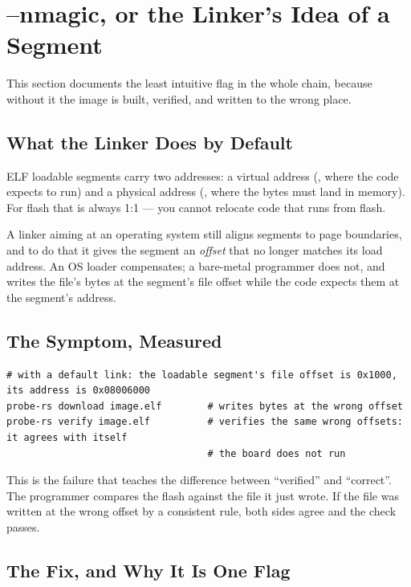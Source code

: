 \section{--nmagic, or the Linker's Idea of a Segment}
\label{sec:build-nmagic}

This section documents the least intuitive flag in the whole chain, because without it the image is
built, verified, and written to the wrong place.

\subsection{What the Linker Does by Default}

ELF loadable segments carry two addresses: a virtual address (, where the code expects
to run) and a physical address (, where the bytes must land in memory). For flash that
is always 1:1 — you cannot relocate code that runs from flash.

A linker aiming at an operating system still aligns segments to page boundaries, and to do that it
gives the segment an \emph{offset} that no longer matches its load address. An OS loader compensates;
a bare-metal programmer does not, and writes the file's bytes at the segment's file offset while the
code expects them at the segment's address.

\subsection{The Symptom, Measured}

\begin{verbatim}
# with a default link: the loadable segment's file offset is 0x1000, its address is 0x08006000
probe-rs download image.elf        # writes bytes at the wrong offset
probe-rs verify image.elf          # verifies the same wrong offsets: it agrees with itself
                                   # the board does not run
\end{verbatim}

This is the failure that teaches the difference between ``verified'' and ``correct''. The programmer
compares the flash against the file it just wrote. If the file was written at the wrong offset by a
consistent rule, both sides agree and the check passes.

\subsection{The Fix, and Why It Is One Flag}

